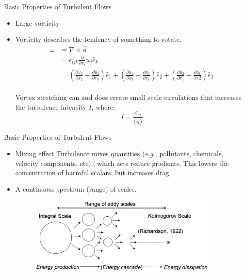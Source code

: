 
\begin{frame}{Basic Properties of Turbulent Flows}
\begin{itemize}
\item Large vorticity\newline\newline
\item Vorticity describes the tendency of something to rotate.
\begin{align*}
\omega &= \nabla \times \vec{u}\\
&= \epsilon_{ijk}\frac{\partial}{\partial x_i}u_j \hat{e}_k\\
&= \left(\frac{\partial u_3}{\partial x_2} - \frac{\partial u_2}{\partial x_3}\right)\hat{e}_1 + \left(\frac{\partial u_1}{\partial x_3} - \frac{\partial u_3}{\partial x_1}\right)\hat{e}_2 + \left(\frac{\partial u_2}{\partial x_1} - \frac{\partial u_1}{\partial x2}\right)\hat{e}_3
\end{align*}
~\\
Vortex stretching can and does create small scale circulations that increases the turbulence intensity $I$, where:
$$I = \frac{\sigma_u}{\langle u \rangle}$$
\end{itemize}
\end{frame}


\begin{frame}{Basic Properties of Turbulent Flows}
\begin{itemize}
\item Mixing effect\newline\newline
Turbulence mixes quantities (\textit{e.g.}, pollutants, chemicals, velocity components, etc)., which acts reduce gradients. This lowers the concentration of harmful scalars, but increases drag.
\item A continuous spectrum (range) of scales.
\begin{figure}
\includegraphics[width=0.9\textwidth]{scales}	
\end{figure}
\end{itemize}
\end{frame}

